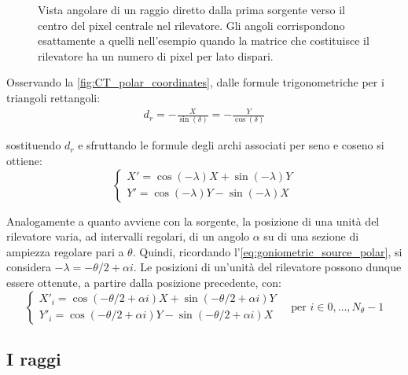 \documentclass[12pt,a4paper]{report}
\begin{document}
\begin{figure}[H]
{
  }
  \caption{\label{fig:CT_polar_coordinates} Vista angolare di un raggio diretto dalla prima sorgente verso il centro del pixel
           centrale nel rilevatore. Gli angoli corrispondono esattamente a quelli nell'esempio quando la matrice che costituisce
           il rilevatore ha un numero di pixel per lato dispari.}
\end{figure}

Osservando la \autoref{fig:CT_polar_coordinates}, dalle formule trigonometriche per i triangoli rettangoli:
\begin{align*}
  d_r = -\frac{X}{\sin(\delta)} = -\frac{Y}{\cos(\delta)}
\end{align*}

sostituendo \(d_r\) e sfruttando le formule degli archi associati per seno e coseno si ottiene:
\begin{equation*}
  \begin{cases}
    X' = \cos(-\lambda) X + \sin(-\lambda) Y \\
    Y' = \cos(-\lambda) Y - \sin(-\lambda) X
  \end{cases}
\end{equation*}

Analogamente a quanto avviene con la sorgente, la posizione di una unità del rilevatore varia, ad intervalli regolari, di
un angolo \(\alpha\) su di una sezione di ampiezza regolare pari a \(\theta\).
Quindi, ricordando l'\autoref{eq:goniometric_source_polar}, si considera \(-\lambda = -\theta/2 + \alpha i\).
Le posizioni di un'unità del rilevatore possono dunque essere ottenute, a partire dalla posizione precedente, con:
\begin{equation*}
  \begin{cases}
    X'_i = \cos(-\theta/2 + \alpha i) X + \sin(-\theta/2 + \alpha i) Y \\
    Y'_i = \cos(-\theta/2 + \alpha i) Y - \sin(-\theta/2 + \alpha i) X
  \end{cases} \quad \text{per } i \in 0,\dots,N_\theta - 1
\end{equation*}

\subsection{I raggi}
\end{document}
